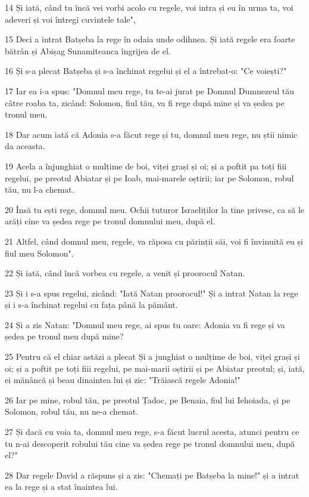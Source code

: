 \par 14 Și iată, când tu încă vei vorbi acolo cu regele, voi intra și eu în urma ta, voi adeveri și voi întregi cuvintele tale",
\par 15 Deci a intrat Batșeba la rege în odaia unde odihnea. Și iată regele era foarte bătrân și Abișag Sunamiteanca îngrijea de el.
\par 16 Și s-a plecat Batșeba și s-a închinat regelui și el a întrebat-o: "Ce voiești?"
\par 17 Iar ea i-a spus: "Domnul meu rege, tu te-ai jurat pe Domnul Dumnezeul tău câtre roaba ta, zicând: Solomon, fiul tău, va fi rege după mine și va ședea pe tronul meu.
\par 18 Dar acum iată că Adonia s-a făcut rege și tu, domnul meu rege, nu știi nimic da aceasta.
\par 19 Acela a înjunghiat o mulțime de boi, viței grași și oi; și a poftit pa toți fiii regelui, pe preotul Abiatar și pe Ioab, mai-marele oștirii; iar pe Solomon, robul tău, nu l-a chemat.
\par 20 Însă tu ești rege, domnul meu. Ochii tuturor Israeliților la tine privesc, ca să le arăți cine va ședea rege pe tronul domnului meu, după el.
\par 21 Altfel, când domnul meu, regele, va răposa cu părinții săi, voi fi învinuită eu și fiul meu Solomon".
\par 22 Și iată, când încă vorbea cu regele, a venit și proorocul Natan.
\par 23 Și i s-a spus regelui, zicând: "Iată Natan proorocul!" Și a intrat Natan la rege și i s-a închinat regelui cu fața până la pământ.
\par 24 Și a zis Natan: "Domnul meu rege, ai spus tu oare: Adonia va fi rege și va ședea pe tronul meu după mine?
\par 25 Pentru că el chiar astăzi a plecat Și a junghiat o mulțime de boi, viței grași și oi; și a poftit pe toți fiii regelui, pe mai-marii oștirii și pe Abiatar preotul; și, iată, ei mănâncă și beau dinaintea lui și zic: "Trăiască regele Adonia!"
\par 26 Iar pe mine, robul tău, pe preotul Țadoc, pe Benaia, fiul lui Iehoiada, și pe Solomon, robul tău, nu ne-a chemat.
\par 27 Și dacă cu voia ta, domnul meu rege, s-a făcut lucrul acesta, atunci pentru ce tu n-ai descoperit robului tău cine va ședea rege pe tronul domnului meu, după el?"
\par 28 Dar regele David a răspuns și a zis: "Chemați pe Batșeba la mine!" și a intrat ea la rege și a stat înaintea lui.
